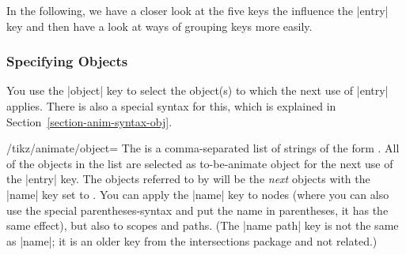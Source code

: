 In the following, we have a closer look at the five keys the influence
the |entry| key and then have a look at ways of grouping keys more
easily. 


\subsubsection{Specifying Objects}
\label{section-anim-def-obj}

You use the |object| key to select the object(s) to which the next use
of |entry| applies. There is also a special syntax for this, which is
explained in Section~\ref{section-anim-syntax-obj}.

\begin{key}{/tikz/animate/object=}
  The  is a comma-separated list of strings of
  the form . All of the objects in
  the list are selected as to-be-animate object for the next use of
  the |entry| key. The objects referred to by  will be
  the \emph{next} objects with the |name| 
  key set to . You can apply the |name| key to nodes
  (where you can also use the special parentheses-syntax and put the
  name in parentheses, it has the same effect), but also to scopes and
  paths. (The |name path| key is not the same as |name|; it is an
  older key from the intersections package and not related.)

\begin{codeexample}[animation list={0.5,1,1.5,2}]
\end{codeexample}
\begin{codeexample}[animation list={0.5,1,1.5,2}]
\end{codeexample}


\end{key}
